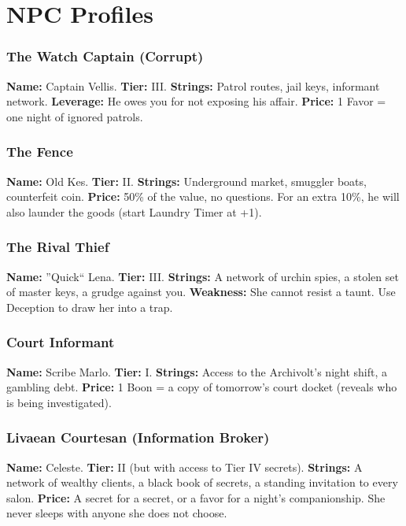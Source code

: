 \documentclass[10pt,twoside]{book}
\begin{document}
\chapter{NPC Profiles}

\subsection{The Watch Captain (Corrupt)}
\textbf{Name:} Captain Vellis.  
\textbf{Tier:} III.  
\textbf{Strings:} Patrol routes, jail keys, informant network.  
\textbf{Leverage:} He owes you for not exposing his affair.  
\textbf{Price:} 1 Favor = one night of ignored patrols.

\subsection{The Fence}
\textbf{Name:} Old Kes.  
\textbf{Tier:} II.  
\textbf{Strings:} Underground market, smuggler boats, counterfeit coin.  
\textbf{Price:} 50\% of the value, no questions. For an extra 10\%, he will also launder the goods (start Laundry Timer at +1).

\subsection{The Rival Thief}
\textbf{Name:} ''Quick`` Lena.  
\textbf{Tier:} III.  
\textbf{Strings:} A network of urchin spies, a stolen set of master keys, a grudge against you.  
\textbf{Weakness:} She cannot resist a taunt. Use Deception to draw her into a trap.

\subsection{Court Informant}
\textbf{Name:} Scribe Marlo.  
\textbf{Tier:} I.  
\textbf{Strings:} Access to the Archivolt's night shift, a gambling debt.  
\textbf{Price:} 1 Boon = a copy of tomorrow's court docket (reveals who is being investigated).

\subsection{Livaean Courtesan (Information Broker)}
\textbf{Name:} Celeste.  
\textbf{Tier:} II (but with access to Tier IV secrets).  
\textbf{Strings:} A network of wealthy clients, a black book of secrets, a standing invitation to every salon.  
\textbf{Price:} A secret for a secret, or a favor for a night's companionship. She never sleeps with anyone she does not choose.
\end{document}

